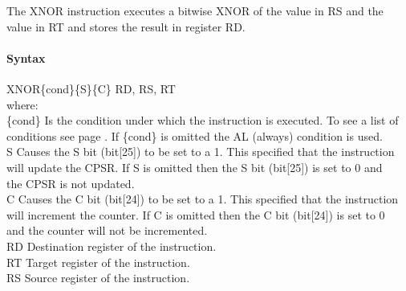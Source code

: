 \documentclass[12pt]{article}
\begin{document}
    \noindent
    The XNOR instruction executes a bitwise XNOR of the value in RS and the value in RT and stores the result in register RD. 
    
    \paragraph{Syntax}
    \begin{flushleft}
    XNOR\{cond\}\{S\}\{C\} RD, RS, RT\\
    \vspace{1em}        %
    where:\\
    \vspace{1em}
    \{cond\}    \hspace{2em} Is the condition under which the instruction is executed. To see a list of\\
                \hspace{5.4em} conditions see page . If \{cond\} is omitted the AL (always) condition is used.\\
    \vspace{1em}    
    S       \hspace{4.5em} Causes the S bit (bit[25]) to be set to a 1. This specified that the instruction\\
            \hspace{5.4em} will update the CPSR. If S is omitted then the S bit (bit[25]) is set to 0 and\\
            \hspace{5.4em} the CPSR is not updated.\\
    \vspace{1em}    
    C       \hspace{4.5em} Causes the C bit (bit[24]) to be set to a 1. This specified that the instruction\\
            \hspace{5.4em} will increment the counter. If C is omitted then the C bit (bit[24]) is set to 0\\
            \hspace{5.4em} and the counter will not be incremented.\\
    \vspace{1em}
    RD  \hspace{3.6em} Destination register of the instruction.\\
    \vspace{1em}
    RT  \hspace{3.7em} Target register of the instruction.\\
    \vspace{1em}
    RS  \hspace{3.85em} Source register of the instruction.\\
    \end{flushleft}
    
\end{document}

